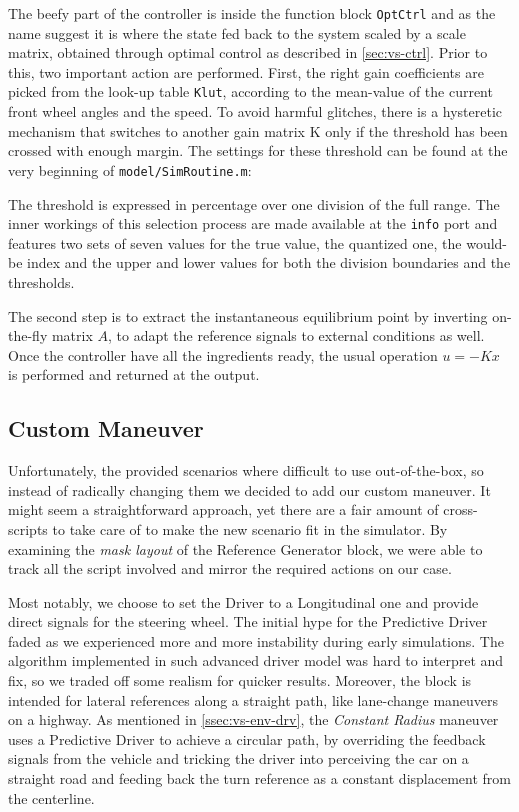 		The beefy part of the controller is inside the function block \lstinline{OptCtrl} and as the name suggest it is where the state fed back to the system scaled by a scale matrix,
		obtained through optimal control as described in \vref{sec:vs-ctrl}. Prior to this, two important action are performed.
		First, the right gain coefficients are picked from the look-up table \lstinline{Klut}, according to the mean-value of the current front wheel angles and the speed.
		To avoid harmful glitches, there is a hysteretic mechanism that switches to another gain matrix K only if the threshold has been crossed with enough margin.
		The settings for these threshold can be found at the very beginning of \texttt{model/SimRoutine.m}:
		
		The threshold is expressed in percentage over one division of the full range. The inner workings of this selection process are made available at the \lstinline{info} port
		and features two sets of seven values for the true value, the quantized one, the would-be index and the upper and lower values for both the division boundaries and
		the thresholds.
		
		The second step is to extract the instantaneous equilibrium point by inverting on-the-fly matrix $A$, to adapt the reference signals to external conditions as well.
		Once the controller have all the ingredients ready, the usual operation $u = -Kx$ is performed and returned at the output.


		\subsection{Custom Maneuver}
		\label{ssec:vs-int-cm}

		Unfortunately, the provided scenarios where difficult to use out-of-the-box, so instead of radically changing them we decided to add our custom maneuver.
		It might seem a straightforward approach, yet there are a fair amount of cross-scripts to take care of to make the new scenario fit in the simulator.
		By examining the \emph{mask layout} of the Reference Generator block, we were able to track all the script involved and mirror the required actions on our case.
		
		Most notably, we choose to set the Driver to a Longitudinal one and provide direct signals for the steering wheel. The initial hype for the Predictive Driver faded as
		we experienced more and more instability during early simulations. The algorithm implemented in such advanced driver model was hard to interpret and fix, so we traded
		off some realism for quicker results. Moreover, the block is intended for lateral references along a straight path, like lane-change maneuvers on a highway.
		As mentioned in \vref{ssec:vs-env-drv}, the \emph{Constant Radius} maneuver uses a Predictive Driver to achieve a circular path, by overriding the feedback signals
		from the vehicle and tricking the driver into perceiving the car on a straight road and feeding back the turn reference as a constant displacement from the centerline.

